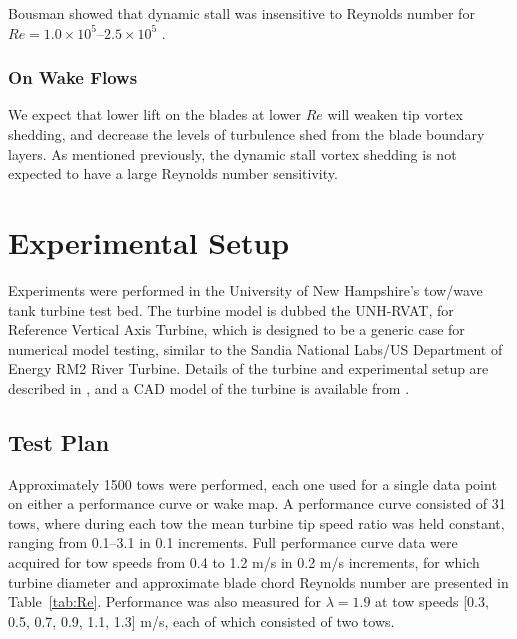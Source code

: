 \documentclass[energies,article,accept,moreauthors,pdftex,12pt,a4paper]{mdpi}
\begin{document}
Bousman showed that dynamic stall was insensitive to Reynolds number for $Re=1.0
\times 10^5$--$2.5 \times 10^5$ \cite{Bousman2000-evaluation}.

\subsubsection{On Wake Flows}

We expect that lower lift on the blades at lower $Re$ will weaken tip vortex
shedding, and decrease the levels of turbulence shed from the blade boundary
layers. As mentioned previously, the dynamic stall vortex shedding is not
expected to have a large Reynolds number sensitivity.


\section{Experimental Setup}

Experiments were performed in the University of New Hampshire's tow/wave tank
turbine test bed. The turbine model is dubbed the UNH-RVAT, for Reference
Vertical Axis Turbine, which is designed to be a generic case for numerical
model testing, similar to the Sandia National Labs/US Department of Energy RM2
River Turbine. Details of the turbine and experimental setup are described in
\cite{Bachant2015-JoT}, and a CAD model of the turbine is available from
\cite{Bachant2014-RVAT-CAD}.



\subsection{Test Plan} 

Approximately 1500 tows were performed, each one used for a single data point on
either a performance curve or wake map. A performance curve consisted of 31
tows, where during each tow the mean turbine tip speed ratio was held constant,
ranging from 0.1--3.1 in 0.1 increments. Full performance curve data were
acquired for tow speeds from 0.4 to 1.2 m/s in 0.2 m/s increments, for which
turbine diameter and approximate blade chord Reynolds number are presented in
Table~\ref{tab:Re}. Performance was also measured for $\lambda=1.9$ at tow
speeds [0.3, 0.5, 0.7, 0.9, 1.1, 1.3] m/s, each of which consisted of two tows.
\end{document}
